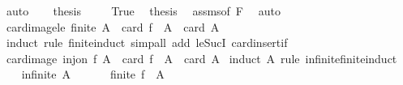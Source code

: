 \begin{isabellebody}
\ auto\isanewline
\ \ \isamarkupfalse%
\ {\isacharquery}{\kern0pt}thesis\ \isacommand{{\isachardot}{\kern0pt}{\isachardot}{\kern0pt}}\isamarkupfalse%
\isanewline
{}\isamarkupfalse%
\isanewline
\ \ \isamarkupfalse%
\ True\ \isamarkupfalse%
\ {\isacharquery}{\kern0pt}thesis\ \isamarkupfalse%
\ assms{\isacharbrackleft}{\kern0pt}of\ F{\isacharbrackright}{\kern0pt}\ \isamarkupfalse%
\ auto\isanewline
{}\isamarkupfalse%
%
\endisatagproof
{\isafoldproof}%
%
\isadelimproof
%
\endisadelimproof
%
\isadelimdocument
%
\endisadelimdocument
%
\isatagdocument
%
\isamarkuptrue%
%
\endisatagdocument
{\isafolddocument}%
%
\isadelimdocument
%
\endisadelimdocument
{}\isamarkupfalse%
\ card{\isacharunderscore}{\kern0pt}image{\isacharunderscore}{\kern0pt}le{\isacharcolon}{\kern0pt}\ {\isachardoublequoteopen}finite\ A\ {\isasymLongrightarrow}\ card\ {\isacharparenleft}{\kern0pt}f\ {\isacharbackquote}{\kern0pt}\ A{\isacharparenright}{\kern0pt}\ {\isasymle}\ card\ A{\isachardoublequoteclose}\isanewline
%
\isadelimproof
\ \ %
\endisadelimproof
%
\isatagproof
{}\isamarkupfalse%
\ {\isacharparenleft}{\kern0pt}induct\ rule{\isacharcolon}{\kern0pt}\ finite{\isacharunderscore}{\kern0pt}induct{\isacharparenright}{\kern0pt}\ {\isacharparenleft}{\kern0pt}simp{\isacharunderscore}{\kern0pt}all\ add{\isacharcolon}{\kern0pt}\ le{\isacharunderscore}{\kern0pt}SucI\ card{\isacharunderscore}{\kern0pt}insert{\isacharunderscore}{\kern0pt}if{\isacharparenright}{\kern0pt}%
\endisatagproof
{\isafoldproof}%
%
\isadelimproof
\isanewline
%
\endisadelimproof
\isanewline
{}\isamarkupfalse%
\ card{\isacharunderscore}{\kern0pt}image{\isacharcolon}{\kern0pt}\ {\isachardoublequoteopen}inj{\isacharunderscore}{\kern0pt}on\ f\ A\ {\isasymLongrightarrow}\ card\ {\isacharparenleft}{\kern0pt}f\ {\isacharbackquote}{\kern0pt}\ A{\isacharparenright}{\kern0pt}\ {\isacharequal}{\kern0pt}\ card\ A{\isachardoublequoteclose}\isanewline
%
\isadelimproof
%
\endisadelimproof
%
\isatagproof
{}\isamarkupfalse%
\ {\isacharparenleft}{\kern0pt}induct\ A\ rule{\isacharcolon}{\kern0pt}\ infinite{\isacharunderscore}{\kern0pt}finite{\isacharunderscore}{\kern0pt}induct{\isacharparenright}{\kern0pt}\isanewline
\ \ \isamarkupfalse%
\ {\isacharparenleft}{\kern0pt}infinite\ A{\isacharparenright}{\kern0pt}\isanewline
\ \ \isamarkupfalse%
\ \isamarkupfalse%
\ {\isachardoublequoteopen}{\isasymnot}\ finite\ {\isacharparenleft}{\kern0pt}f\ {\isacharbackquote}{\kern0pt}\ A{\isacharparenright}{\kern0pt}{\isachardoublequoteclose}\ \isamarkupfalse%

\end{isabellebody}
